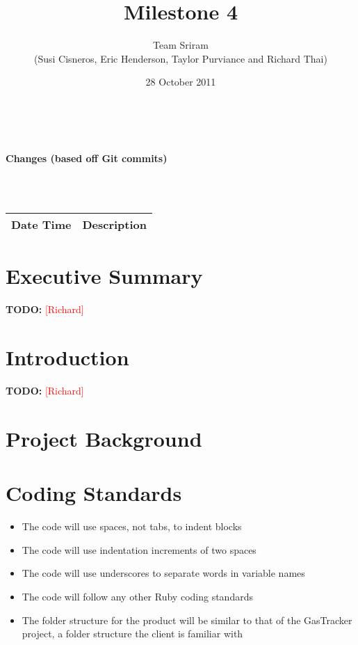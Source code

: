 \documentclass{article}
\newcommand{\richard}{\textcolor{red}{[Richard]}}
\begin{document}
\setlength{\voffset}{3.5in}
\title{Milestone 4}
\author{Team Sriram\\
(Susi Cisneros, Eric Henderson, Taylor Purviance and Richard Thai)}
\date{28 October 2011}
\maketitle
\clearpage
\setlength{\voffset}{0pt}
\tableofcontents
\clearpage
~\\
\begin{Large}\textbf{Changes (based off Git commits)}\end{Large}\\
~\\
\begin{tabular}{ | p{2in} | p{4.5in} | }
\hline
\textbf{Date Time} & \textbf{Description}\\
\hline
\hline
\end{tabular}
\clearpage
\section{Executive Summary}
\textbf{TODO:} \richard

\section{Introduction}
\textbf{TODO:} \richard

\section{Project Background}

\section{Coding Standards}
\begin{itemize}
\item The code will use spaces, not tabs, to indent blocks
\item The code will use indentation increments of two spaces
\item The code will use underscores to separate words in variable names
\item The code will follow any other Ruby coding standards
\item The folder structure for the product will be similar to that of the GasTracker project, a folder structure the client is familiar with
\end{itemize}
\end{document}

